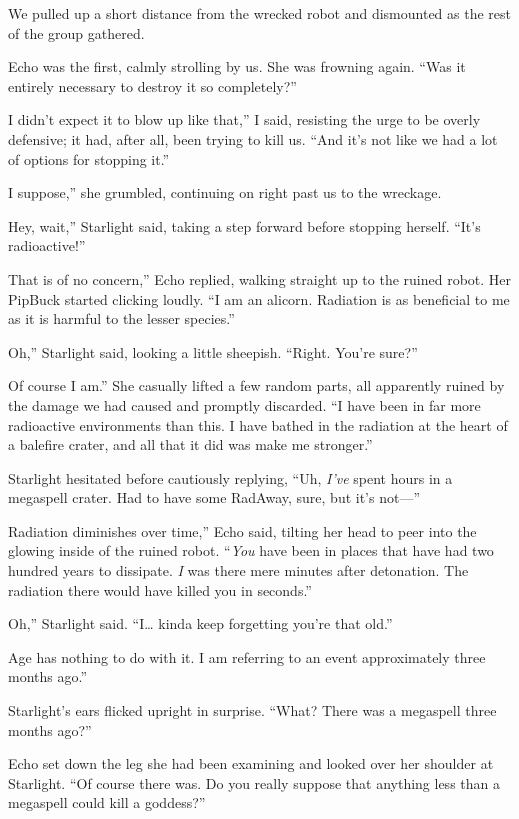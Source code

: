 We pulled up a short distance from the wrecked robot and dismounted as the rest of the group gathered.

Echo was the first, calmly strolling by us. She was frowning again. “Was it entirely necessary to destroy it so completely?”

\leavevmode{}I didn’t expect it to blow up like that,” I said, resisting the urge to be overly defensive; it had, after all, been trying to kill us. “And it’s not like we had a lot of options for stopping it.”

\leavevmode{}I suppose,” she grumbled, continuing on right past us to the wreckage.

\leavevmode{}Hey, wait,” Starlight said, taking a step forward before stopping herself. “It’s radioactive!”

\leavevmode{}That is of no concern,” Echo replied, walking straight up to the ruined robot. Her PipBuck started clicking loudly. “I am an alicorn. Radiation is as beneficial to me as it is harmful to the lesser species.”

\leavevmode{}Oh,” Starlight said, looking a little sheepish. “Right. You’re sure?”

\leavevmode{}Of course I am.” She casually lifted a few random parts, all apparently ruined by the damage we had caused and promptly discarded. “I have been in far more radioactive environments than this. I have bathed in the radiation at the heart of a balefire crater, and all that it did was make me stronger.”

Starlight hesitated before cautiously replying, “Uh, \textit{I’ve} spent hours in a megaspell crater. Had to have some RadAway, sure, but it’s not—”

\leavevmode{}Radiation diminishes over time,” Echo said, tilting her head to peer into the glowing inside of the ruined robot. “\textit{You} have been in places that have had two hundred years to dissipate. \textit{I} was there mere minutes after detonation. The radiation there would have killed you in seconds.”

\leavevmode{}Oh,” Starlight said. “I… kinda keep forgetting you’re that old.”

\leavevmode{}Age has nothing to do with it. I am referring to an event approximately three months ago.”

Starlight’s ears flicked upright in surprise. “What? There was a megaspell three months ago?”

Echo set down the leg she had been examining and looked over her shoulder at Starlight. “Of course there was. Do you really suppose that anything less than a megaspell could kill a goddess?”

